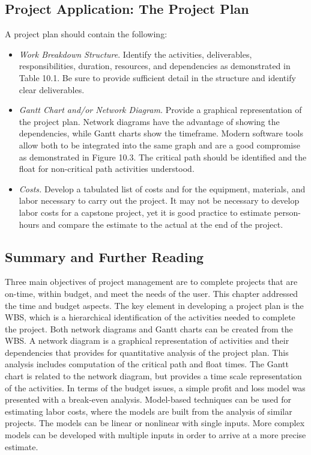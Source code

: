 \subsection{\texorpdfstring{\hfill\break
Project Application: The Project
Plan}{ Project Application: The Project Plan}}\label{project-application-the-project-plan}

A project plan should contain the following:

\begin{itemize}
\item
  \emph{Work Breakdown Structure}. Identify the activities,
  deliverables, responsibilities, duration, resources, and dependencies
  as demonstrated in Table 10.1. Be sure to provide sufficient detail in
  the structure and identify clear deliverables.
\item
  \emph{Gantt Chart and/or Network Diagram.} Provide a graphical
  representation of the project plan. Network diagrams have the
  advantage of showing the dependencies, while Gantt charts show the
  timeframe. Modern software tools allow both to be integrated into the
  same graph and are a good compromise as demonstrated in Figure 10.3.
  The critical path should be identified and the float for non-critical
  path activities understood.
\item
  \emph{Costs.} Develop a tabulated list of costs and for the equipment,
  materials, and labor necessary to carry out the project. It may not be
  necessary to develop labor costs for a capstone project, yet it is
  good practice to estimate person-hours and compare the estimate to the
  actual at the end of the project.
\end{itemize}

\subsection{Summary and Further
Reading}\label{summary-and-further-reading}

Three main objectives of project management are to complete projects
that are on-time, within budget, and meet the needs of the user. This
chapter addressed the time and budget aspects. The key element in
developing a project plan is the WBS, which is a hierarchical
identification of the activities needed to complete the project. Both
network diagrams and Gantt charts can be created from the WBS. A network
diagram is a graphical representation of activities and their
dependencies that provides for quantitative analysis of the project
plan. This analysis includes computation of the critical path and float
times. The Gantt chart is related to the network diagram, but provides a
time scale representation of the activities. In terms of the budget
issues, a simple profit and loss model was presented with a break-even
analysis. Model-based techniques can be used for estimating labor costs,
where the models are built from the analysis of similar projects. The
models can be linear or nonlinear with single inputs. More complex
models can be developed with multiple inputs in order to arrive at a
more precise estimate.

